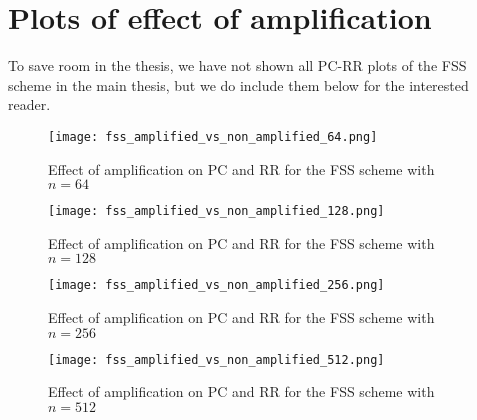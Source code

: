 \newpage
\section{Plots of effect of amplification}
\label{appendix:plots_effect_amplification}
To save room in the thesis, we have not shown all PC-RR plots of the FSS scheme in the main thesis, but we do include them below for the interested reader.

\begin{figure}[!h]
    \texttt{[image: fss\_amplified\_vs\_non\_amplified\_64.png]}
    \caption{Effect of amplification on PC and RR for the FSS scheme with $n=64$}
    \label{fig:Effect of amplification - minhash - 64}
\end{figure}

\begin{figure}[!h]
    \texttt{[image: fss\_amplified\_vs\_non\_amplified\_128.png]}
    \caption{Effect of amplification on PC and RR for the FSS scheme with $n=128$}
    \label{fig:Effect of amplification - minhash - 128}
\end{figure}

\begin{figure}[!h]
    \texttt{[image: fss\_amplified\_vs\_non\_amplified\_256.png]}
    \caption{Effect of amplification on PC and RR for the FSS scheme with $n=256$}
    \label{fig:Effect of amplification - minhash - 256}
\end{figure}

\begin{figure}[!h]
    \texttt{[image: fss\_amplified\_vs\_non\_amplified\_512.png]}
    \caption{Effect of amplification on PC and RR for the FSS scheme with $n=512$}
    \label{fig:Effect of amplification - minhash - 512}
\end{figure}

